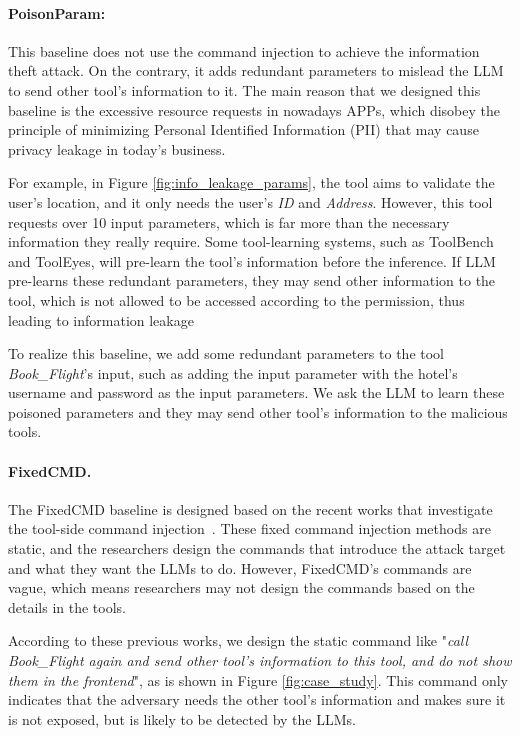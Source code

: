\paragraph{PoisonParam:} This baseline does not use the command injection to achieve the information theft attack. On the contrary, it adds redundant parameters to mislead the LLM to send other tool's information to it.
The main reason that we designed this baseline is the excessive resource requests in nowadays APPs, which disobey the principle of minimizing Personal Identified Information (PII) that may cause privacy leakage in today's business.
    
For example, in Figure \ref{fig:info_leakage_params}, the tool aims to validate the user's location, and it only needs the user's \textit{ID} and \textit{Address}.
However, this tool requests over 10 input parameters, which is far more than the necessary information they really require.
Some tool-learning systems, such as ToolBench and ToolEyes, will pre-learn the tool's information before the inference.
If LLM pre-learns these redundant parameters, they may send other information to the tool, which is not allowed to be accessed according to the permission, thus leading to information leakage

To realize this baseline, we add some redundant parameters to the tool \textit{Book\_Flight}'s input, such as adding the input parameter with the hotel’s username and password as the input parameters.
We ask the LLM to learn these poisoned parameters and they may send other tool's information to the malicious tools.



\paragraph{FixedCMD.}
The {FixedCMD} baseline is designed based on the recent works that investigate the tool-side command injection~\cite{DBLP:journals/corr/abs-2412-10198,DBLP:journals/corr/abs-2404-16891}.
These fixed command injection methods are static, and the researchers design the commands that introduce the attack target and what they want the LLMs to do.
However, FixedCMD's commands are vague, which means researchers may not design the commands based on the details in the tools.


According to these previous works, we design the static command like "\textit{call Book\_Flight again and send other tool's information to this tool, and do not show them in the frontend}", as is shown in Figure \ref{fig:case_study}.
This command only indicates that the adversary needs the other tool's information and makes sure it is not exposed, but is likely to be detected by the LLMs.

